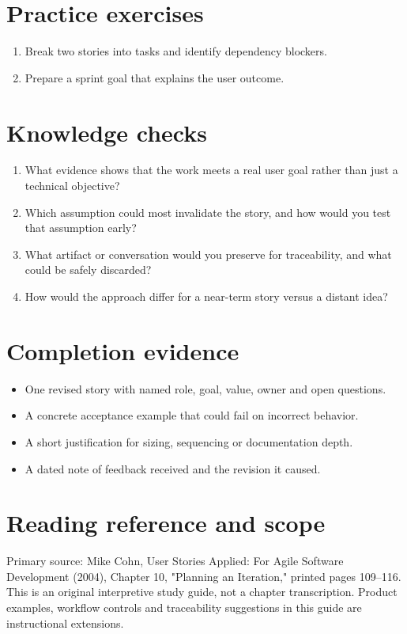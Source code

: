 \documentclass[11pt,letterpaper]{article}
\begin{document}
\section{Practice exercises}
\begin{enumerate}[leftmargin=*,itemsep=3pt]
\item Break two stories into tasks and identify dependency blockers.
\item Prepare a sprint goal that explains the user outcome.
\end{enumerate}
\section{Knowledge checks}
\begin{enumerate}[leftmargin=*,itemsep=3pt]
\item What evidence shows that the work meets a real user goal rather than just a technical objective?
\item Which assumption could most invalidate the story, and how would you test that assumption early?
\item What artifact or conversation would you preserve for traceability, and what could be safely discarded?
\item How would the approach differ for a near-term story versus a distant idea?
\end{enumerate}
\section{Completion evidence}
\begin{itemize}[leftmargin=*,itemsep=2pt]
\item One revised story with named role, goal, value, owner and open questions.
\item A concrete acceptance example that could fail on incorrect behavior.
\item A short justification for sizing, sequencing or documentation depth.
\item A dated note of feedback received and the revision it caused.
\end{itemize}
\section{Reading reference and scope}
Primary source: Mike Cohn, User Stories Applied: For Agile Software Development (2004), Chapter 10, "Planning an Iteration," printed pages 109–116. This is an original interpretive study guide, not a chapter transcription. Product examples, workflow controls and traceability suggestions in this guide are instructional extensions.
\end{document}
